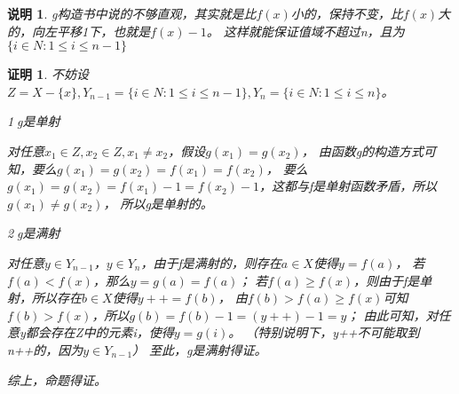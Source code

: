 \documentclass{article}
\theoremstyle{mystyle}
\newtheorem*{zremark}{说明}
\theoremstyle{zproofstyle}
\newtheorem*{zproof}{证明}
\begin{document}
\begin{zgraytheorem}
  \begin{zremark}
    g构造书中说的不够直观，其实就是比$f(x)$小的，保持不变，比$f(x)$大的，向左平移1下，也就是$f(x)-1$。
    这样就能保证值域不超过n，且为$\{i \in N: 1 \leq i \leq n-1\}$
  \end{zremark}
\end{zgraytheorem}

\begin{zproof}

  不妨设$Z=X - \{x\}, Y_{n-1}=\{i \in N: 1 \leq i \leq n-1\},Y_{n}=\{i \in N: 1 \leq i \leq n\} $。

  \textcircled{1}g是单射

  对任意$x_1 \in Z, x_2 \in Z, x_1 \neq x_2$，假设$g(x_1) = g(x_2)$，
  由函数g的构造方式可知，要么$g(x_1)=g(x_2)=f(x_1)=f(x_2)$，
  要么$g(x_1)=g(x_2)=f(x_1)-1=f(x_2)-1$，这都与f是单射函数矛盾，所以$g(x_1) \neq g(x_2)$，
  所以g是单射的。

  \textcircled{2}g是满射

  对任意$y \in Y_{n-1}$，$y \in Y_n$，由于f是满射的，则存在$a \in X$使得$y=f(a)$，
  若$f(a) < f(x)$，那么$y=g(a)=f(a)$；
  若$f(a) \geq f(x)$，则由于f是单射，所以存在$b \in X$使得$y++=f(b)$，
  由$f(b) > f(a) \geq f(x)$可知$f(b) > f(x)$，所以$g(b)=f(b)-1=(y++)-1=y$；
  由此可知，对任意y都会存在Z中的元素i，使得$y=g(i)$。
  （特别说明下，y++不可能取到n++的，因为$y \in Y_{n-1}$）
  至此，g是满射得证。

  综上，命题得证。
\end{zproof}
\end{document}
